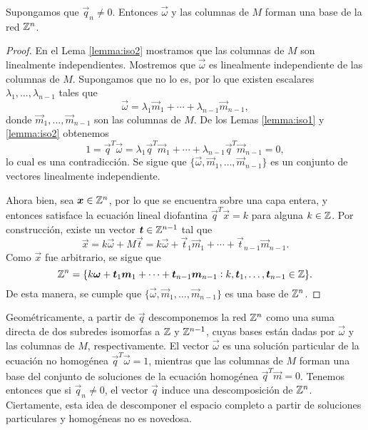 \begin{theorem}
	\label{th:lattice}
	Supongamos que $\vec{q}_n \neq 0$. Entonces $\vec{\omega}$ y las columnas de $M$ forman una base
	de la red $\mathbb{Z}^n$.
\end{theorem}
\begin{proof}
	En el Lema \ref{lemma:iso2} mostramos que las columnas de $M$ son linealmente independientes.
	Mostremos que $\vec{\omega}$ es linealmente independiente de las columnas de $M$. Supongamos que
	no lo es, por lo que existen escalares $\lambda_1, \ldots, \lambda_{n-1}$ tales que
	\begin{equation*}
		\vec{\omega} = \lambda_1 \vec{m}_1 + \cdots + \lambda_{n-1} \vec{m}_{n-1},
	\end{equation*}
	donde $\vec{m}_1, \ldots, \vec{m}_{n-1}$ son las columnas de $M$. De los Lemas \ref{lemma:iso1}
	y \ref{lemma:iso2} obtenemos
	\begin{equation*}
		1 = \vec{q}^T\vec{\omega} = \lambda_1 \vec{q}^T\vec{m}_1 + \cdots + \lambda_{n-1}
		\vec{q}^T\vec{m}_{n-1} = 0,
	\end{equation*}
	lo cual es una contradicción. Se sigue que $\lbrace \vec{\omega}, \vec{m}_1, \ldots,
	\vec{m}_{n-1}\rbrace$ es un conjunto de vectores linealmente independiente.

	Ahora bien, sea $\boldsymbol{x} \in \mathbb{Z}^n$, por lo que se encuentra sobre una capa entera, y entonces
	satisface la ecuación lineal diofantina $\vec{q}^T\vec{x} = k$ para alguna $k \in \mathbb{Z}$. Por
	construcción, existe un vector $\boldsymbol{t} \in \mathbb{Z}^{n-1}$ tal que
	\begin{equation*}
		\vec{x} = k\vec{\omega} + M\vec{t} = k\vec{\omega} + \vec{t}_1\vec{m}_1 + \cdots +
		\vec{t}_{n-1}\vec{m}_{n-1}.
	\end{equation*}
	Como $\vec{x}$ fue arbitrario, se sigue que
	\begin{equation*}
		\mathbb{Z}^n = \lbrace
		k\boldsymbol{\omega} + \boldsymbol{t}_1\boldsymbol{m}_1 + \cdots + \boldsymbol{t}_{n-1}\boldsymbol{m}_{n-1}
		\vcentcolon k, \boldsymbol{t}_1, \ldots, \boldsymbol{t}_{n-1} \in \mathbb{Z}
		\rbrace.
	\end{equation*}
	De esta manera, se cumple que $\lbrace \vec{\omega}, \vec{m}_1, \ldots, \vec{m}_{n-1}\rbrace$ es
	una base de $\mathbb{Z}^n$.
\end{proof}

Geométricamente, a partir de $\vec{q}$ descomponemos la red $\mathbb{Z}^n$ como una suma directa de dos
subredes isomorfas a $\mathbb{Z}$ y $\mathbb{Z}^{n-1}$, cuyas bases están dadas por $\vec{\omega}$ y las columnas de
$M$, respectivamente. El vector $\vec{\omega}$ es una solución particular de la ecuación no
homogénea $\vec{q}^T\vec{\omega} = 1$, mientras que las columnas de $M$ forman una base del conjunto
de soluciones de la ecuación homogénea $\vec{q}^T\vec{m} = 0$. Tenemos entonces que si $\vec{q}_n
\neq 0$, el vector $\vec{q}$ induce una descomposición de $\mathbb{Z}^n$. Ciertamente, esta idea de
descomponer el espacio completo a partir de soluciones particulares y homogéneas no es novedosa.


